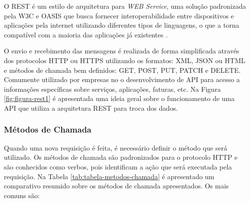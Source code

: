        O \gls{REST} é um estilo de arquitetura para \textit{\gls{WEB} Service},  uma solução padronizada pela \gls{W3C} e \gls{OASIS} que busca fornecer interoperabilidade entre dispositivos e aplicações pela internet utilizando diferentes tipos de linguagens, o que a torna compatível com a maioria das aplicações já existentes \cite{W3C}.
        
        O envio e recebimento das mensagens é realizada de forma simplificada através dos protocolos \gls{HTTP} ou \gls{HTTPS} utilizando os formatos: \gls{XML}, \gls{JSON} ou \gls{HTML} e métodos de chamada bem definidos: GET, POST, PUT, PATCH e DELETE. Comumente utilizado por empresas no o desenvolvimento de \gls{API} para acesso a informações específicas sobre serviços, aplicações, faturas, etc. Na Figura \ref{fig:figura-rest1} é apresentada uma ideia geral sobre o funcionamento de uma API que utiliza a arquitetura REST para troca dos dados.
            
            \begin{figure}[!h]
    	    \end{figure}
    	
    	\subsubsection{Métodos de Chamada}
    	\label{sec:metodos-chamada}
    	
    	Quando uma nova requisição é feita, é necessário definir o método que será utilizado. Os métodos de chamada são padronizados para o protocolo \gls{HTTP} e são conhecidos como verbos, pois identificam a ação que será executada pela requisição. Na Tabela \ref{tab:tabela-metodos-chamada} é apresentado um comparativo resumido sobre os métodos de chamada apresentados. Os mais comuns são:
    	
